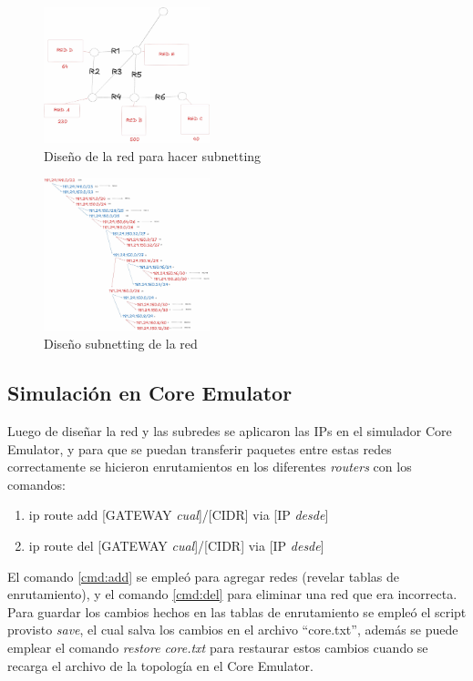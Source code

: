 \documentclass[letterpaper, 10 pt, conference]{ieeeconf}  %
\begin{document}
\begin{figure}[H]
	\centering
	\includegraphics[width=0.43\textwidth]{./Imagenes/red_subnetting_diseno.jpg}
	\caption{Diseño de la red para hacer subnetting}
\end{figure}

\begin{figure}[H]
	\centering
	\includegraphics[width=0.43\textwidth]{./Imagenes/subnetting_total.jpg}
	\caption{Diseño subnetting de la red}
\end{figure}

\subsection{Simulación en Core Emulator}

Luego de diseñar la red y las subredes se aplicaron las IPs en el simulador Core Emulator, y para que se puedan transferir paquetes entre estas redes correctamente se hicieron enrutamientos en los diferentes \textit{routers} con los comandos:

\begin{enumerate}
	\item ip route add [GATEWAY \textit{cual}]/[CIDR] via [IP \textit{desde}] \label{cmd:add}
	\item ip route del [GATEWAY \textit{cual}]/[CIDR] via [IP \textit{desde}] \label{cmd:del}
\end{enumerate}

El comando \ref{cmd:add} se empleó para agregar redes (revelar tablas de enrutamiento), y el comando \ref{cmd:del} para eliminar una red que era incorrecta. Para guardar los cambios hechos en las tablas de enrutamiento se empleó el script provisto \textit{save}, el cual salva los cambios en el archivo ``core.txt'', además se puede emplear el comando \textit{restore core.txt} para restaurar estos cambios cuando se recarga el archivo de la topología en el Core Emulator.
\end{document}
